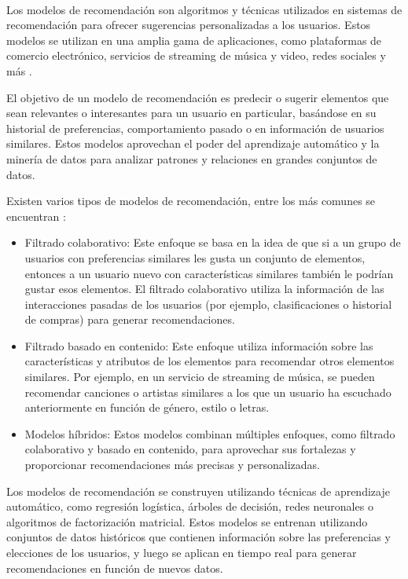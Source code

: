 \\
Los modelos de recomendación son algoritmos y técnicas utilizados en sistemas de recomendación para ofrecer sugerencias personalizadas a los usuarios. Estos modelos se utilizan en una amplia gama de aplicaciones, como plataformas de comercio electrónico, servicios de streaming de música y video, redes sociales y más \cite{crear-recomendacion}.

El objetivo de un modelo de recomendación es predecir o sugerir elementos que sean relevantes o interesantes para un usuario en particular, basándose en su historial de preferencias, comportamiento pasado o en información de usuarios similares. Estos modelos aprovechan el poder del aprendizaje automático y la minería de datos para analizar patrones y relaciones en grandes conjuntos de datos.

Existen varios tipos de modelos de recomendación, entre los más comunes se encuentran \cite{recomendation-systems}:

\begin{itemize}
    \item Filtrado colaborativo: Este enfoque se basa en la idea de que si a un grupo de usuarios con preferencias similares les gusta un conjunto de elementos, entonces a un usuario nuevo con características similares también le podrían gustar esos elementos. El filtrado colaborativo utiliza la información de las interacciones pasadas de los usuarios (por ejemplo, clasificaciones o historial de compras) para generar recomendaciones.
    \item Filtrado basado en contenido: Este enfoque utiliza información sobre las características y atributos de los elementos para recomendar otros elementos similares. Por ejemplo, en un servicio de streaming de música, se pueden recomendar canciones o artistas similares a los que un usuario ha escuchado anteriormente en función de género, estilo o letras.
    \item Modelos híbridos: Estos modelos combinan múltiples enfoques, como filtrado colaborativo y basado en contenido, para aprovechar sus fortalezas y proporcionar recomendaciones más precisas y personalizadas.
\end{itemize}

Los modelos de recomendación se construyen utilizando técnicas de aprendizaje automático, como regresión logística, árboles de decisión, redes neuronales o algoritmos de factorización matricial. Estos modelos se entrenan utilizando conjuntos de datos históricos que contienen información sobre las preferencias y elecciones de los usuarios, y luego se aplican en tiempo real para generar recomendaciones en función de nuevos datos.

